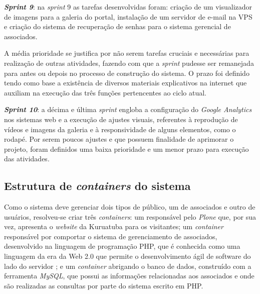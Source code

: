 \textbf{\textit{Sprint 9}}: na \textit{sprint} 9 as tarefas desenvolvidas foram: criação de um visualizador de imagens para a galeria do portal, instalação de um servidor de e-mail na VPS e criação do sistema de recuperação de senhas para o sistema gerencial de associados.

A média prioridade se justifica por não serem tarefas cruciais e necessárias para realização de outras atividades, fazendo com que a \textit{sprint} pudesse ser remanejada para antes ou depois no processo de construção do sistema. O prazo foi definido tendo como base a existência de diversos materiais explicativos na internet que auxiliam na execução das três funções pertencentes ao ciclo atual.


\textbf{\textit{Sprint 10}}: a décima e última \textit{sprint} engloba a configuração do \textit{Google Analytics} nos sistemas web e a execução de ajustes visuais, referentes à reprodução de vídeos e imagens da galeria e à responsividade de alguns elementos, como o rodapé. Por serem poucos ajustes e que possuem finalidade de aprimorar o projeto, foram definidos uma baixa prioridade e um menor prazo para execução das atividades. 






\hspace{2.5cm}
\subsection{Estrutura de \textit{containers} do sistema}
\label{subsec:docker}
\hspace{2.5cm}

Como o sistema deve gerenciar dois tipos de público, um de associados e outro de usuários, resolveu-se criar três \textit{containers}: um responsável pelo \textit{Plone} que, por sua vez, apresenta o \textit{website} da Kuruatuba para os visitantes; um \textit{container} responsável por comportar o sistema de gerenciamento de associados, desenvolvido na linguagem de programação PHP, que é conhecida como uma linguagem da era da Web 2.0 que permite o desenvolvimento ágil de software do lado do servidor ; e um \textit{container} abrigando o banco de dados, construído com a ferramenta \textit{MySQL}, que possui as informações relacionadas aos associados e onde são realizadas as consultas por parte do sistema escrito em PHP.

